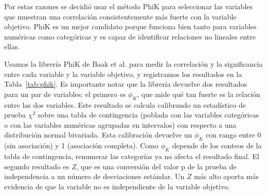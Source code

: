\documentclass{ieeeaccess}
\begin{document}
Por estas razones se decidió usar el método PhiK \cite{BAAK2020107043PHIK} para seleccionar las variables que muestran una correlación consistentemente más fuerte con la variable objetivo. PhiK es un mejor candidato porque funciona bien tanto para variables numéricas como categóricas y es capaz de identificar relaciones no lineales entre ellas.

Usamos la librería PhiK de Baak et al. para medir la correlación y la significancia entre cada variable y la variable objetivo, y registramos los resultados en la Tabla~\ref{tab:phik}. Es importante notar que la librería devuelve dos resultados para un par de variables: el primero es $\phi_{K}$, que mide qué tan fuerte es la relación entre las dos variables. Este resultado se calcula calibrando un estadístico de prueba $\chi^2$ sobre una tabla de contingencia (poblada con las variables categóricas o con las variables numéricas agrupadas en intervalos) con respecto a una distribución normal bivariada. Esta calibración devuelve un $\phi_{K}$ con rango entre 0 (sin asociación) y 1 (asociación completa). Como $\phi_{K}$ depende de los conteos de la tabla de contingencia, renumerar las categorías ya no afecta el resultado final. El segundo resultado es $Z$, que es una conversión del valor p de la prueba de independencia a un número de desviaciones estándar. Un $Z$ más alto aporta más evidencia de que la variable no es independiente de la variable objetivo.
\end{document}
